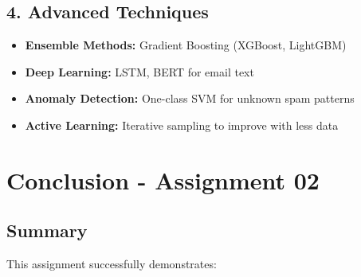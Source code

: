 \documentclass[14pt,a4paper]{report}
\begin{document}
\subsection{4. Advanced Techniques}

\begin{itemize}
    \item \textbf{Ensemble Methods:} Gradient Boosting (XGBoost, LightGBM)
    \item \textbf{Deep Learning:} LSTM, BERT for email text
    \item \textbf{Anomaly Detection:} One-class SVM for unknown spam patterns
    \item \textbf{Active Learning:} Iterative sampling to improve with less data
\end{itemize}

\section{Conclusion - Assignment 02}

\subsection{Summary}

This assignment successfully demonstrates:
\end{document}
